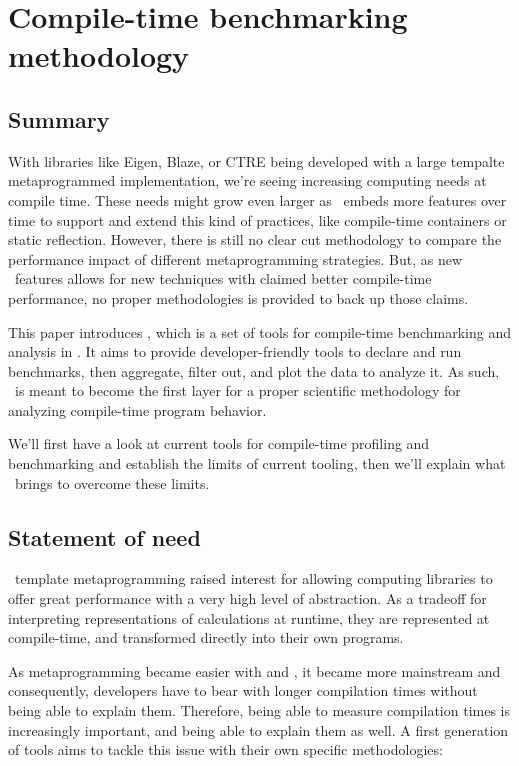 \documentclass[../../main.tex]{subfiles}
\begin{document}
\chapter{Compile-time benchmarking methodology}

\section{Summary}

With libraries like Eigen\cite{eigen}, Blaze\cite{blazelib}, or CTRE\cite{ctre} being
developed with a large tempalte metaprogrammed implementation, we're seeing
increasing computing needs at compile time. These needs might grow even larger
as \cpp~embeds more features over time to support and extend this kind of
practices, like compile-time containers\cite{more-constexpr-containers} or static
reflection\cite{static-reflection}. However, there is still no clear cut methodology
to compare the performance impact of different metaprogramming strategies. But,
as new \cpp~features allows for new techniques with claimed better compile-time
performance, no proper methodologies is provided to back up those claims.

This paper introduces \ctbench, which is a set of tools for compile-time
benchmarking and analysis in \cpp. It aims to provide developer-friendly tools to
declare and run benchmarks, then aggregate, filter out, and plot the data to
analyze it. As such, \ctbench~is meant to become the first layer for a proper
scientific methodology for analyzing compile-time program behavior.

We'll first have a look at current tools for compile-time profiling and
benchmarking and establish the limits of current tooling, then we'll explain
what \ctbench~brings to overcome these limits.

\section{Statement of need}

\cpp~template metaprogramming raised interest for allowing computing libraries to
offer great performance with a very high level of abstraction. As a tradeoff for
interpreting representations of calculations at runtime, they are represented at
compile-time, and transformed directly into their own programs.

As metaprogramming became easier with  and , it became more mainstream
and consequently, developers have to bear with longer compilation times without
being able to explain them. Therefore, being able to measure compilation times
is increasingly important, and being able to explain them as well. A first
generation of tools aims to tackle this issue with their own specific
methodologies:
\end{document}
